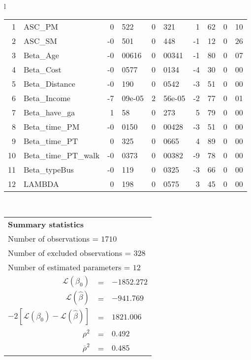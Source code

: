 \begin{tabular}{l}
\begin{tabular}{rlr@{.}lr@{.}lr@{.}lr@{.}l}
1 & ASC_PM  & 0&522 & 0&321 & 1&62 & 0&10\\
2 & ASC_SM & -0&501 & 0&448 & -1&12 & 0&26\\
3 & Beta_Age & -0&00616 & 0&00341 & -1&80 & 0&07\\
4 & Beta_Cost & -0&0577 & 0&0134 & -4&30 & 0&00\\
5 & Beta_Distance & -0&190 & 0&0542 & -3&51 & 0&00\\
6 & Beta_Income & -7&09e-05 & 2&56e-05 & -2&77 & 0&01\\
7 & Beta_have_ga & 1&58 & 0&273 & 5&79 & 0&00\\
8 & Beta_time_PM & -0&0150 & 0&00428 & -3&51 & 0&00\\
9 & Beta_time_PT & 0&325 & 0&0665 & 4&89 & 0&00\\
10 & Beta_time_PT_walk & -0&0373 & 0&00382 & -9&78 & 0&00\\
11 & Beta_typeBus & -0&119 & 0&0325 & -3&66 & 0&00\\
12 & LAMBDA & 0&198 & 0&0575 & 3&45 & 0&00\\
\hline
\end{tabular}
\\
\begin{tabular}{rcl}
\multicolumn{3}{l}{\bf Summary statistics}\\
\multicolumn{3}{l}{ Number of observations = $1710$} \\
\multicolumn{3}{l}{ Number of excluded observations = $328$} \\
\multicolumn{3}{l}{ Number of estimated  parameters = $12$} \\
 $\mathcal{L}(\beta_0)$ &=&  $-1852.272$ \\
 $\mathcal{L}(\hat{\beta})$ &=& $-941.769 $  \\
 $-2[\mathcal{L}(\beta_0) -\mathcal{L}(\hat{\beta})]$ &=& $1821.006$ \\
    $\rho^2$ &=&   $0.492$ \\
    $\bar{\rho}^2$ &=&    $0.485$ \\
\end{tabular}
  \end{tabular}
